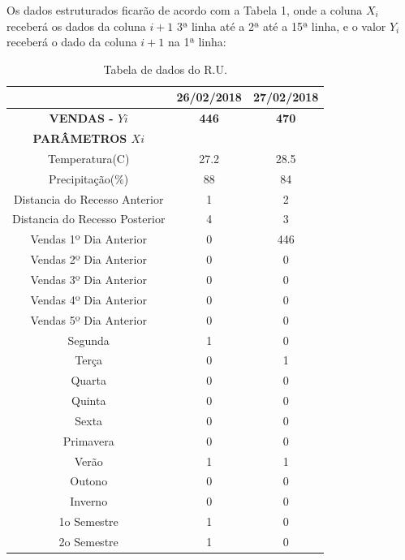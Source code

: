 \documentclass[	12pt, Times, openright, twoside, a4paper, english, brazil]{abntex2}
\begin{document}
	Os dados estruturados ficarão de acordo com a Tabela 1, onde a coluna $X_i$ receberá os dados da coluna $i+1$ 3ª linha até a 2ª até a 15ª linha, e o valor $Y_i$ receberá o dado da coluna $i+1$ na 1ª linha:
	\begin{table}[!ht]
		\centering
		\caption{Tabela de dados do R.U.}	\label{tab:regressaoMultipla}
		
		\begin{tabular}{|c|c|c|}
			\hline \textbf{ }   					&\textbf{26/02/2018} 	&\textbf{27/02/2018}\\
			\hline \textbf{VENDAS - $Yi$}   		&\textbf{446} 			&\textbf{470}\\
			\hline \textbf{PARÂMETROS $Xi$} 		&\textbf{ } 			&\textbf{ }\\
			\hline Temperatura(C)      				&27.2 	 				& 28.5\\
			\hline Precipitação(\%)    				& 88         			& 84\\
			
			\hline Distancia do Recesso Anterior	& 1						& 2\\
			\hline Distancia do Recesso Posterior	& 4						& 3\\
			
			\hline Vendas 1º Dia Anterior			& 0						& 446\\
			\hline Vendas 2º Dia Anterior			& 0						& 0\\
			\hline Vendas 3º Dia Anterior			& 0						& 0\\
			\hline Vendas 4º Dia Anterior			& 0						& 0\\
			\hline Vendas 5º Dia Anterior			& 0						& 0\\
			
			\hline Segunda             				& 1          		& 0\\
			\hline Terça               				& 0          		& 1\\
			\hline Quarta              				& 0          		& 0\\
			\hline Quinta              				& 0          		& 0\\
			\hline Sexta               				& 0          		& 0\\
			
			\hline Primavera           				& 0          		& 0\\
			\hline Verão               				& 1          		& 1\\
			\hline Outono              				& 0          		& 0\\
			\hline Inverno             				& 0          		& 0\\
			
			\hline 1o Semestre         				& 1          		& 0\\
			\hline 2o Semestre         				& 1          		& 0\\
		\end{tabular}
	\end{table}
	
\end{document}
